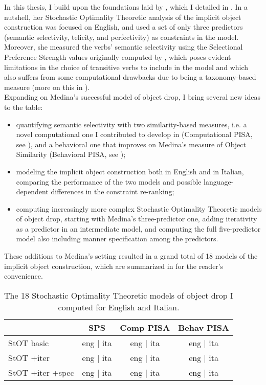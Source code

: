 In this thesis, I build upon the foundations laid by \textcite{Medina2007}, which I detailed in . In a nutshell, her Stochastic Optimality Theoretic analysis of the implicit object construction was focused on English, and used a set of only three predictors (semantic selectivity, telicity, and perfectivity) as constraints in the model. Moreover, she measured the verbs' semantic selectivity using the Selectional Preference Strength values originally computed by \textcite{Resnik1993,Resnik1996}, which poses evident limitations in the choice of transitive verbs to include in the model and which also suffers from some computational drawbacks due to being a taxonomy-based measure (more on this in ).\\
Expanding on Medina's successful model of object drop, I bring several new ideas to the table:
\begin{itemize}
    \item quantifying semantic selectivity with two similarity-based measures, i.e. a novel computational one I contributed to develop in \textcite{CappelliLenciPISA} (Computational PISA, see ), and a behavioral one that improves on Medina's measure of Object Similarity (Behavioral PISA, see );
    \item modeling the implicit object construction both in English and in Italian, comparing the performance of the two models and possible language-dependent differences in the constraint re-ranking;
    \item computing increasingly more complex Stochastic Optimality Theoretic models of object drop, starting with Medina's three-predictor one, adding iterativity as a predictor in an intermediate model, and computing the full five-predictor model also including manner specification among the predictors.
\end{itemize}
These additions to Medina's setting resulted in a grand total of 18 models of the implicit object construction, which are summarized in  for the reader's convenience.

\begin{table}[htb] %
\caption{The 18 Stochastic Optimality Theoretic models of object drop I computed for English and Italian.}
\begin{tabular}{l|ccc}
& SPS & Comp PISA & Behav PISA \\
\hline
StOT basic & eng | ita          & eng | ita   & eng | ita   \\
StOT +iter & eng | ita  & eng | ita & eng | ita \\
StOT +iter +spec & eng | ita   & eng | ita   & eng | ita  
\end{tabular}
\end{table}

